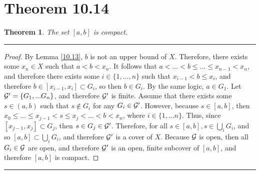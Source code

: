 \documentclass[openany, amssymb, psamsfonts]{amsart}
\newtheorem{thm}{Theorem}[section]
\theoremstyle{definition}
\numberwithin{equation}{section}
\begin{document}
\section*{Theorem 10.14}
\begin{thm}
\label{10.14}
The set $[a, b]$ is compact.
\end{thm}
\vspace{4pt}     \hrule   \vspace{4pt}\begin{proof}
By Lemma \ref{10.13}, $b$ is not an upper bound of $X$. Therefore, there exists some $x_n\in X$ such that $a<b<x_n$. It follows that $a<...<b\leq ...\leq x_{n-1}<x_n$, and therefore there exists some $i\in \{1,...,n\}$ such that $x_{i-1} < b \leq x_{i}$, and therefore $b\in [x_{i-1}, x_i] \subset G_i$, so then $b\in G_i$. By the same logic, $a\in G_1$. Let $\mathcal G' = \{G_1,...G_n\}$, and therefore $\mathcal G'$ is finite. Assume that there exists some $s\in (a,b)$ such that $s\notin G_i$ for any $G_i\in \mathcal G'$. However, because $s\in [a,b]$, then $x_0\leq...\leq x_{j-1}<s\leq x_j<...<b<x_n$, where $i\in \{1,...n\}$. Thus, since $[x_{j-1},x_j]\subset G_j$, then $s\in G_j\in \mathcal G'$. Therefore, for all $s\in [a,b], s\in \bigcup_iG_i$, and so $[a,b]\subset \bigcup_iG_i$, and therefore $\mathcal G'$ is a cover of $X$. Because $\mathcal G$ is open, then all $G_i\in \mathcal G$ are open, and therefore $\mathcal G'$ is an open, finite subcover of $[a,b]$, and therefore $[a,b]$ is compact. 
\end{proof}\vspace{4pt}     \hrule   \vspace{4pt}
\end{document}
